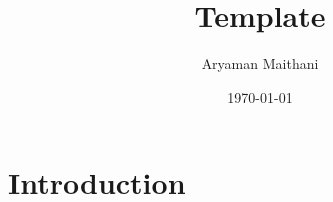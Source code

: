 \documentclass[12pt]{article}
\title{Template}
\author{Aryaman Maithani}
\date{\today}
\begin{document}
\maketitle

\section{Introduction}

\end{document}
